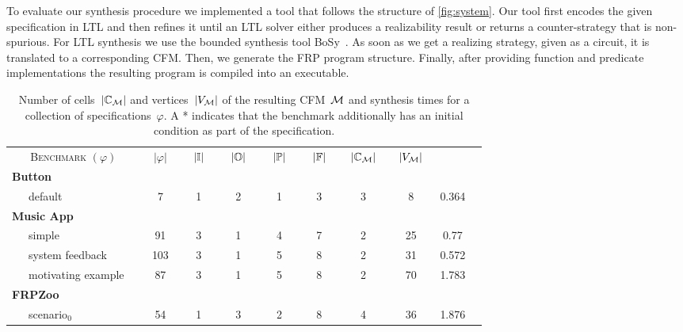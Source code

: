 To evaluate our synthesis procedure we implemented a tool that follows
the structure of \cref{fig:system}.  Our tool first encodes the given
\TSL specification in LTL and then refines it until an LTL solver
either produces a realizability result or returns a counter-strategy
that is non-spurious. For LTL synthesis we use the bounded synthesis
tool BoSy~\cite{bosy}. As soon as we get a realizing strategy, given
as a circuit, it is translated to a corresponding CFM. Then, we
generate the FRP program structure. Finally, after providing function
and predicate implementations the resulting program is compiled into
an executable.

\begin{table}[htbp]
\centering
\caption{Number of cells~$ |\mathbb{C}_{\mathcal{M}}| $ and
  vertices~$ |V_{\mathcal{M}}|$ of the resulting CFM~$ \mathcal{M} $ and
  synthesis times for a collection of \TSL specifications~$ \varphi
  $. A * indicates that the benchmark additionally has an initial
  condition as part of the specification.}
\label{table:results}
\begin{tabular}{|l||c|c|c|c|c||c|c|c|c|}
\hline
\multicolumn{1}{|c||}{\multirow{2}{*}{\textsc{Benchmark} $ (\varphi) $}}
  & \multicolumn{1}{c|}{\multirow{2}{*}{\ \,$| \varphi |$\ \,}}
  & \multicolumn{1}{c|}{\multirow{2}{*}{\ \,$| \mathbb{I} |$\ \,}}
  & \multicolumn{1}{c|}{\multirow{2}{*}{\ \,$| \mathbb{O} |$\ \,}}
  & \multicolumn{1}{c|}{\multirow{2}{*}{\ \,$| \mathbb{P} |$\ \,}}
  & \multicolumn{1}{c||}{\multirow{2}{*}{\ \,$| \mathbb{F} |$\ \,}}
  & \multicolumn{1}{c|}{\multirow{2}{*}{\ $| \mathbb{C}_{\mathcal{M}} |$\ }}
  & \multicolumn{1}{c|}{\multirow{2}{*}{\ $| V_{\mathcal{M}} |$\ }}
  & \multicolumn{1}{c|}{\raisebox{-2pt}{\ \textsc{Synthesis}\ }}
  \\
&&&&&&&&\raisebox{0pt}{\textsc{Time (s)}}\\
\hline \hline
\textbf{Button} &&&&&&&& \\
\ \ \ default & 7 & 1 & 2 & 1 &  3 & 3 & 8 & 0.364 \\
\hline
\textbf{Music App} &&&&&&&& \\
\ \ \ simple & 91 & 3 & 1 & 4 & 7 & 2 & 25 & 0.77 \\ %
\ \ \ system feedback & 103 & 3 & 1 & 5 & 8 & 2 & 31 & 0.572 \\ %
\ \ \ motivating example \mbox{\quad\ \,} & 87 & 3 & 1 & 5 & 8 & 2 & 70 & 1.783 \\ %
\hline
\textbf{FRPZoo} &&&&&&&& \\
\ \ \ scenario\hspace{0.5pt}$_{0} $ & 54 & 1 & 3 & 2 & 8 & 4 & 36 & 1.876 \\ %

\end{tabular}
\end{table}
